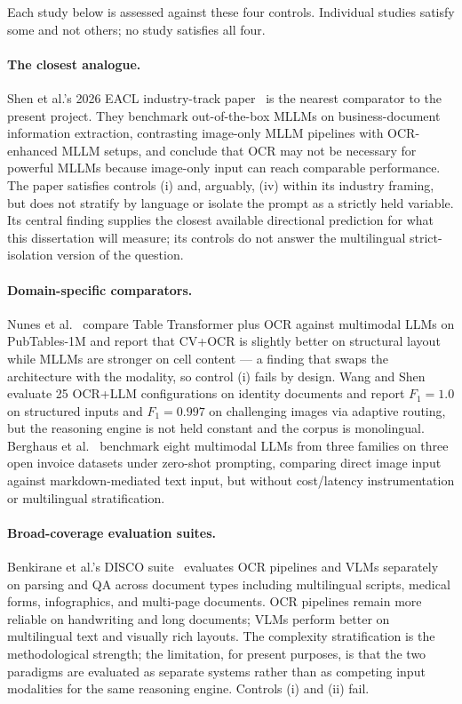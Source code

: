 Each study below is assessed against these four controls. Individual
studies satisfy some and not others; no study satisfies all four.

\paragraph{The closest analogue.} Shen et al.'s 2026 EACL
industry-track paper~\cite{shen2026ocrornot} is the nearest comparator
to the present project. They benchmark out-of-the-box MLLMs on
business-document information extraction, contrasting image-only MLLM
pipelines with OCR-enhanced MLLM setups, and conclude that OCR may not
be necessary for powerful MLLMs because image-only input can reach
comparable performance. The paper satisfies controls (i) and,
arguably, (iv) within its industry framing, but does not stratify by
language or isolate the prompt as a strictly held variable. Its
central finding supplies the closest available directional prediction
for what this dissertation will measure; its controls do not answer
the multilingual strict-isolation version of the question.

\paragraph{Domain-specific comparators.} Nunes et
al.~\cite{nunes2025tables} compare Table Transformer plus OCR against
multimodal LLMs on PubTables-1M and report that CV+OCR is slightly
better on structural layout while MLLMs are stronger on cell content
--- a finding that swaps the architecture with the modality, so
control (i) fails by design. Wang and Shen~\cite{wang2025hybrid}
evaluate 25 OCR+LLM configurations on identity documents and report
$F_1 = 1.0$ on structured inputs and $F_1 = 0.997$ on challenging
images via adaptive routing, but the reasoning engine is not held
constant and the corpus is monolingual. Berghaus et
al.~\cite{berghaus2025multimodal} benchmark eight multimodal LLMs
from three families on three open invoice datasets under zero-shot
prompting, comparing direct image input against markdown-mediated
text input, but without cost/latency instrumentation or multilingual
stratification.

\paragraph{Broad-coverage evaluation suites.} Benkirane et al.'s
DISCO suite~\cite{benkirane2026disco} evaluates OCR pipelines and
VLMs separately on parsing and QA across document types including
multilingual scripts, medical forms, infographics, and multi-page
documents. OCR pipelines remain more reliable on handwriting and
long documents; VLMs perform better on multilingual text and
visually rich layouts. The complexity stratification is the
methodological strength; the limitation, for present purposes, is
that the two paradigms are evaluated as separate systems rather than
as competing input modalities for the same reasoning engine.
Controls (i) and (ii) fail.

